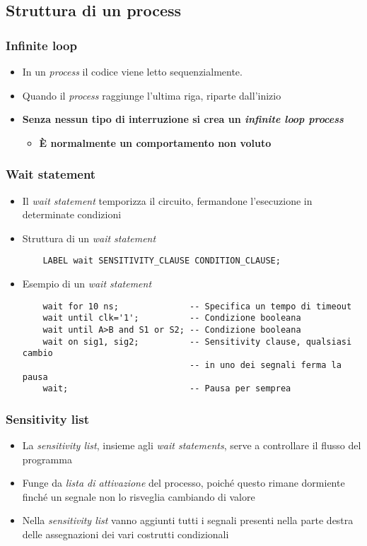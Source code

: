 \documentclass{article}
\begin{document}
\subsection{Struttura di un process}
\subsubsection{Infinite loop}
\begin{itemize}
	\item In un \textit{process} il codice viene letto sequenzialmente.
	\item Quando il \textit{process} raggiunge l'ultima riga, riparte dall'inizio
	\item \textbf{Senza nessun tipo di interruzione si crea un \textit{infinite loop process}}
	\begin{itemize}
		\item \textbf{\`E normalmente un comportamento non voluto}
	\end{itemize}
\end{itemize}
\subsubsection{Wait statement}
\begin{itemize}
	\item Il \textit{wait statement} temporizza il circuito, fermandone l'esecuzione in determinate condizioni
	\item Struttura di un \textit{wait statement}
	      \begin{verbatim}
    LABEL wait SENSITIVITY_CLAUSE CONDITION_CLAUSE;
	      \end{verbatim}
	      
\newpage	      
	      
	\item Esempio di un \textit{wait statement}
	      \begin{verbatim}
    wait for 10 ns;              -- Specifica un tempo di timeout
    wait until clk='1';          -- Condizione booleana
    wait until A>B and S1 or S2; -- Condizione booleana
    wait on sig1, sig2;          -- Sensitivity clause, qualsiasi cambio
                                 -- in uno dei segnali ferma la pausa
    wait;                        -- Pausa per semprea
	      \end{verbatim} 
\end{itemize}
\subsubsection{Sensitivity list}
\begin{itemize}
	\item La \textit{sensitivity list}, insieme agli \textit{wait statements}, serve a controllare il flusso del programma
	\item Funge da \textit{lista di attivazione} del processo, poiché questo rimane dormiente finché un segnale non lo risveglia cambiando di valore
	\item Nella \textit{sensitivity list} vanno aggiunti tutti i segnali presenti nella parte destra delle assegnazioni dei vari costrutti condizionali
\end{itemize}
\end{document}
